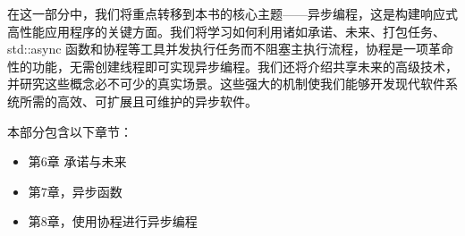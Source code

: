 在这一部分中，我们将重点转移到本书的核心主题——异步编程，这是构建响应式高性能应用程序的关键方面。我们将学习如何利用诸如承诺、未来、打包任务、 std::async 函数和协程等工具并发执行任务而不阻塞主执行流程，协程是一项革命性的功能，无需创建线程即可实现异步编程。我们还将介绍共享未来的高级技术，并研究这些概念必不可少的真实场景。这些强大的机制使我们能够开发现代软件系统所需的高效、可扩展且可维护的异步软件。

本部分包含以下章节：

\begin{itemize}
\item
第6章 承诺与未来

\item
第7章，异步函数

\item
第8章，使用协程进行异步编程
\end{itemize}
